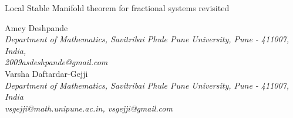 \begin{center}
	{\LARGE Local Stable Manifold theorem for fractional systems revisited}
\end{center}
\vspace{0.5cm}
\begin{center}
	{
		{\Large Amey Deshpande\\}
		\textit{ Department of Mathematics, Savitribai Phule Pune University, Pune - 411007, India,\\ 2009asdeshpande@gmail.com\\}
	}
	{\Large Varsha Daftardar-Gejji\\}
	\textit{Department of Mathematics, Savitribai Phule Pune University, Pune - 411007, India\\ vsgejji@math.unipune.ac.in, vsgejji@gmail.com}\\
	\end{center}
	\begin{abstract}
	The subject of fractional calculus has witnessed rapid development over past few decades. In particular the area of fractional differential equations has received considerable attention. Several theoretical results have been obtained and powerful numerical methods have been developed. In spite of the extensive numerical simulations that have been carried out in the area of fractional order dynamical systems, analytical results obtained are very few. In pursuance to this, present authors have extended local stable manifold theorem in case of fractional systems \cite{deshpande2016local}. 	Cong et al. \cite{cong2016stable} have pointed out discrepancies in the asymptotic expansion of two-parameter Mittag-Leffler functions with matrix argument (\textit{cf.} Lemma 4 part 2 of article \cite{deshpande2016local}). In the present communication we give the corrected expansion of the same and prove the local stable manifold theorem by following the same approach given in \cite{deshpande2016local}.
	\end{abstract}
